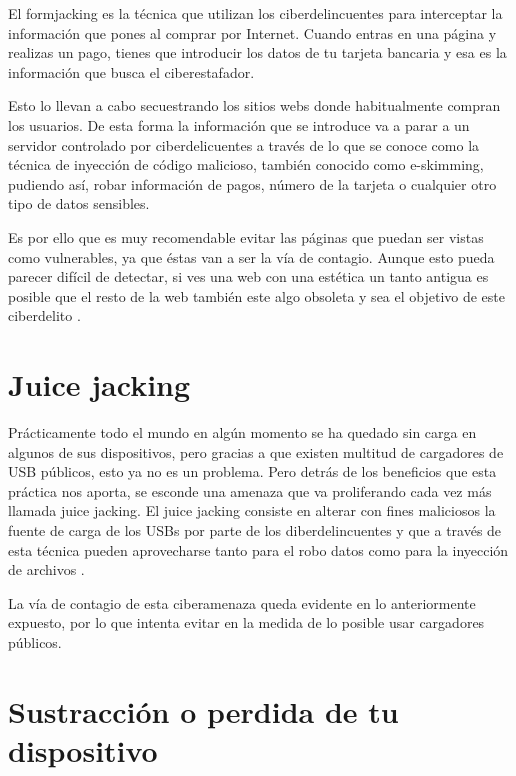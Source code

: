 \documentclass[
  spanish,
  a4paper,
  openany]{book}
\begin{document}
El formjacking es la técnica que utilizan los ciberdelincuentes para interceptar la información que pones al comprar por Internet. Cuando entras en una página y realizas un pago, tienes que introducir los datos de tu tarjeta bancaria y esa es la información que busca el ciberestafador.

Esto lo llevan a cabo secuestrando los sitios webs donde habitualmente compran los usuarios. De esta forma la información que se introduce va a parar a un servidor controlado por ciberdelicuentes a través de lo que se conoce como la técnica de inyección de código malicioso, también conocido como e-skimming, pudiendo así, robar información de pagos, número de la tarjeta o cualquier otro tipo de datos sensibles.

Es por ello que es muy recomendable evitar las páginas que puedan ser vistas como vulnerables, ya que éstas van a ser la vía de contagio. Aunque esto pueda parecer difícil de detectar, si ves una web con una estética un tanto antigua es posible que el resto de la web también este algo obsoleta y sea el objetivo de este ciberdelito \citep{RZ-formjacking}.

\hypertarget{juice-jacking}{%
\section{Juice jacking}\label{juice-jacking}}

Prácticamente todo el mundo en algún momento se ha quedado sin carga en algunos de sus dispositivos, pero gracias a que existen multitud de cargadores de USB públicos, esto ya no es un problema. Pero detrás de los beneficios que esta práctica nos aporta, se esconde una amenaza que va proliferando cada vez más llamada juice jacking. El juice jacking consiste en alterar con fines maliciosos la fuente de carga de los USBs por parte de los diberdelincuentes y que a través de esta técnica pueden aprovecharse tanto para el robo datos como para la inyección de archivos \citep{ESET-juice-jacking}.

La vía de contagio de esta ciberamenaza queda evidente en lo anteriormente expuesto, por lo que intenta evitar en la medida de lo posible usar cargadores públicos.

\hypertarget{sustracciuxf3n-o-perdida-de-tu-dispositivo}{%
\section{Sustracción o perdida de tu dispositivo}\label{sustracciuxf3n-o-perdida-de-tu-dispositivo}}
\end{document}
